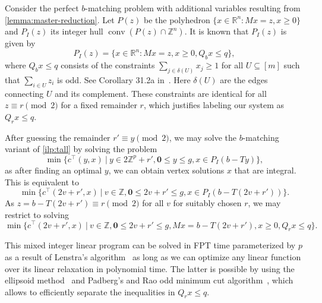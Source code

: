 \documentclass[a4paper,UKenglish,cleveref,thm-restate]{lipics-v2021}
\newcommand{\R}{\mathbb R}
\newcommand{\Z}{\mathbb Z}
\newcommand{\veczero}{\mathbf0}
\DeclareMathOperator{\conv}{conv}
\begin{document}
Consider the perfect $b$-matching problem with additional variables resulting from \cref{lemma:master-reduction}. Let $P(z)$ be the polyhedron $\{x\in\R^n:Mx=z,x\ge0\}$ and $P_I(z)$ its integer hull $\conv(P(z)\cap\Z^n)$. It is known that $P_I(z)$ is given by
\[
    P_I(z)=\{x\in\R^n:Mx=z,x\ge0,Q_bx\le q\},
\]
where $Q_bx\le q$ consists of the constraints $\sum_{j\in\delta(U)}x_j\ge1$ for all $U\subseteq[m]$ such that $\sum_{i\in U}z_i$ is odd. See Corollary 31.2a in~\cite{schrijver2003combinatorial}. Here $\delta(U)$ are the edges connecting $U$ and its complement. These constraints are identical for all $z\equiv r\pmod2$ for a fixed remainder $r$, which justifies labeling our system as $Q_rx\le q$.

After guessing the remainder $r'\equiv y\pmod2$, we may solve the $b$-matching variant of \cref{ilp:tall} by solving the problem
\[
    \min\{c^\top(y,x)\ \vert\ y\in2\Z^p+r',\veczero\le y\le g,x\in P_I(b-Ty)\},
\]
as after finding an optimal $y$, we can obtain vertex solutions $x$ that are integral. This is equivalent to
\[
    \min\{c^\top(2v+r',x)\ \vert\ v\in\Z,\veczero\le 2v+r'\le g,x\in P_I(b-T(2v+r'))\}.
\]
As $z=b-T(2v+r')\equiv r\pmod2$ for all $v$ for suitably chosen $r$, we may restrict to solving
\[
    \min\{c^\top(2v+r',x)\ \vert\ v\in\Z,\veczero\le 2v+r'\le g,Mx=b-T(2v+r'),x\ge0,Q_rx\le q\}.
\]

This mixed integer linear program can be solved in FPT time parameterized by $p$ as a result of Lenstra's algorithm~\cite{DBLP:journals/mor/Lenstra83} as long as we can optimize any linear function over its linear relaxation in polynomial time. The latter is possible by using the ellipsoid method~\cite{DBLP:books/sp/GLS1988} and Padberg's and Rao odd minimum cut algorithm~\cite{DBLP:journals/mor/PadbergR82}, which allows to efficiently separate the inequalities in $Q_rx\le q$. 
\end{document}
